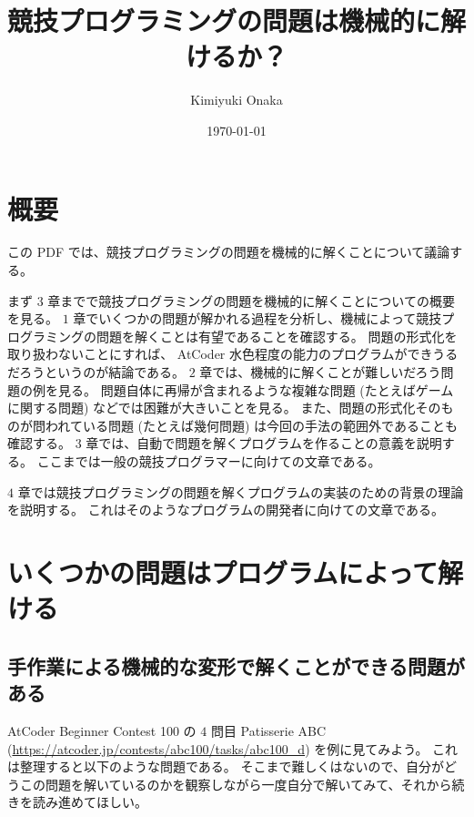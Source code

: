 \documentclass{ltjsarticle}
\title{競技プログラミングの問題は機械的に解けるか？}
\author{Kimiyuki Onaka}
\date{\today}
\begin{document}
\maketitle

\setcounter{section}{-1}
\section{概要}

この PDF では、競技プログラミングの問題を機械的に解くことについて議論する。

まず $3$ 章までで競技プログラミングの問題を機械的に解くことについての概要を見る。
$1$ 章でいくつかの問題が解かれる過程を分析し、機械によって競技プログラミングの問題を解くことは有望であることを確認する。
問題の形式化を取り扱わないことにすれば、 AtCoder 水色程度の能力のプログラムができうるだろうというのが結論である。
$2$ 章では、機械的に解くことが難しいだろう問題の例を見る。
問題自体に再帰が含まれるような複雑な問題 (たとえばゲームに関する問題) などでは困難が大きいことを見る。
また、問題の形式化そのものが問われている問題 (たとえば幾何問題) は今回の手法の範囲外であることも確認する。
$3$ 章では、自動で問題を解くプログラムを作ることの意義を説明する。
ここまでは一般の競技プログラマーに向けての文章である。

$4$ 章では競技プログラミングの問題を解くプログラムの実装のための背景の理論を説明する。
これはそのようなプログラムの開発者に向けての文章である。

\section{いくつかの問題はプログラムによって解ける}

\subsection{手作業による機械的な変形で解くことができる問題がある}

AtCoder Beginner Contest 100 の $4$ 問目 Patisserie ABC (\url{https://atcoder.jp/contests/abc100/tasks/abc100_d}) を例に見てみよう。
これは整理すると以下のような問題である。
そこまで難しくはないので、自分がどうこの問題を解いているのかを観察しながら一度自分で解いてみて、それから続きを読み進めてほしい。
\end{document}
